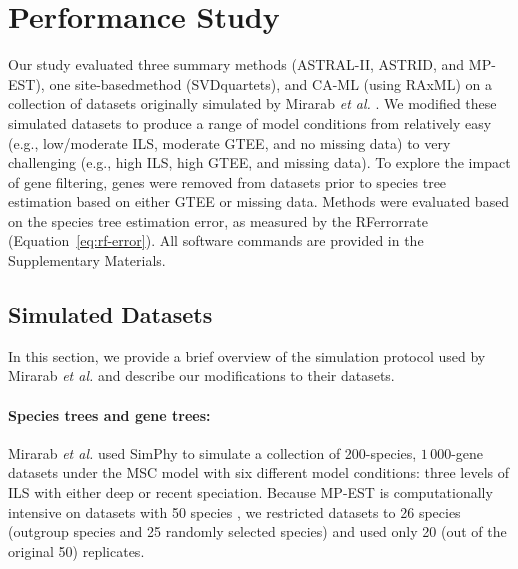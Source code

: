 \section{Performance Study}
\label{sec:include-study}
Our study evaluated three summary methods (ASTRAL-II,   ASTRID, and MP-EST), one \gls{site-basedmethod} (SVDquartets), and CA-ML (using RAxML) on a collection of datasets originally simulated by Mirarab {\em et al.} \cite{mirarab2015astral2}. 
We modified these simulated datasets to produce a range of model conditions from relatively easy (e.g., low/moderate ILS, moderate GTEE, and no missing data) to very challenging (e.g., high ILS, high GTEE, and missing data). 
To explore the impact of gene filtering, genes were removed from datasets prior to species tree estimation based on either GTEE or missing data. 
Methods were evaluated based on the species tree estimation error, as measured by the \gls{RFerrorrate} (Equation~\ref{eq:rf-error}).
All software commands are provided in the Supplementary Materials.

\subsection{Simulated Datasets}
In this section, we provide a brief overview of the simulation protocol used by Mirarab {\em et al.} \cite{mirarab2015astral2} and describe our modifications to their datasets.

\paragraph{Species trees and gene trees:} 
Mirarab {\em et al.} \cite{mirarab2015astral2} used \gls{SimPhy} \cite{mallo2016simphy} to simulate a collection of 200-species, $1\,000$-gene datasets under the MSC model with six different model conditions: three levels of ILS with either deep or recent speciation.
Because MP-EST is computationally intensive on datasets with 50 species \cite{bayzid2014disk, mirarab2015astral2}, we restricted datasets to 26 species (outgroup species and 25 randomly selected species) and used only 20 (out of the original 50) replicates.

